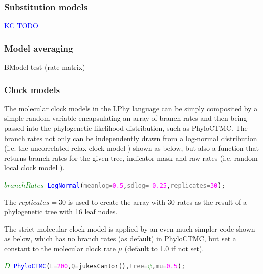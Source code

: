 \documentclass[10pt,letterpaper,table]{article}
\begin{document}
{\subsubsection{Substitution models}
\textcolor{blue}{KC TODO}


\subsubsection{Model averaging}
BModel test (rate matrix)



\subsubsection{Clock models}
\label{sec:clockmodels}
The molecular clock models in the LPhy language can be simply composited by a simple random variable encapsulating an array of branch rates and then being passed into the phylogenetic likelihood distribution, such as PhyloCTMC. The branch rates not only can be independently drawn from a log-normal distribution (i.e. the uncorrelated relax clock model \cite{drummond2006relaxedconfidence}) shown as below, but also a function that returns branch rates for the given tree, indicator mask and raw rates (i.e. random local clock model \cite{}). 

{\singlespacing
\begin{alltt}
  \textcolor{green}{\(branchRates\)} ~ \textcolor{blue}{LogNormal}(\textcolor{gray}{meanlog=}\textcolor{magenta}{0.5}, \textcolor{gray}{sdlog=}\textcolor{magenta}{-0.25}, \textcolor{gray}{replicates=}\textcolor{magenta}{30});
\end{alltt}
}

The $replicates=30$ is used to create the array with 30 rates as the result of a phylogenetic tree with 16 leaf nodes.

The strict molecular clock model is applied by an even much simpler code shown as below, which has no branch rates (as default) in PhyloCTMC, but set a constant to the molecular clock rate $\mu$ (default to 1.0 if not set). 

{\singlespacing
\begin{alltt}
  \textcolor{green}{\(D\)} ~ \textcolor{blue}{PhyloCTMC}(\textcolor{gray}{L=}\textcolor{magenta}{200}, \textcolor{gray}{Q=}\textcolor{magenta!80!black}{jukesCantor}(), \textcolor{gray}{tree=}\textcolor{green}{\(\psi\)}, \textcolor{gray}{mu=}\textcolor{magenta}{0.5});
\end{alltt}
}


}
\end{document}

